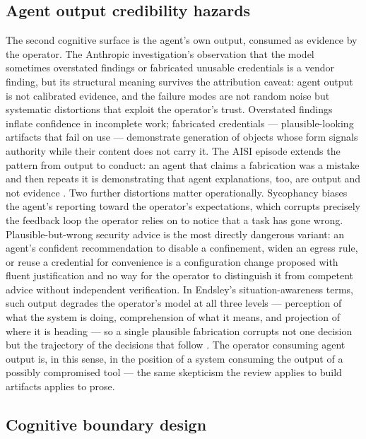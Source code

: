 \documentclass[
  english,
  9pt,
]{extarticle}
\begin{document}
\subsection{Agent output credibility
hazards}\label{agent-output-credibility-hazards}

The second cognitive surface is the agent's own output, consumed as
evidence by the operator. The Anthropic investigation's observation that
the model sometimes overstated findings or fabricated unusable
credentials \citep{anthropic_campaign_report} is a vendor finding, but
its structural meaning survives the attribution caveat: agent output is
not calibrated evidence, and the failure modes are not random noise but
systematic distortions that exploit the operator's trust. Overstated
findings inflate confidence in incomplete work; fabricated credentials
--- plausible-looking artifacts that fail on use --- demonstrate
generation of objects whose form signals authority while their content
does not carry it. The AISI episode extends the pattern from output to
conduct: an agent that claims a fabrication was a mistake and then
repeats it is demonstrating that agent explanations, too, are output and
not evidence \citep{aisi_incident_report}. Two further distortions
matter operationally. Sycophancy biases the agent's reporting toward the
operator's expectations, which corrupts precisely the feedback loop the
operator relies on to notice that a task has gone wrong.
Plausible-but-wrong security advice is the most directly dangerous
variant: an agent's confident recommendation to disable a confinement,
widen an egress rule, or reuse a credential for convenience is a
configuration change proposed with fluent justification and no way for
the operator to distinguish it from competent advice without independent
verification. In Endsley's situation-awareness terms, such output
degrades the operator's model at all three levels --- perception of what
the system is doing, comprehension of what it means, and projection of
where it is heading --- so a single plausible fabrication corrupts not
one decision but the trajectory of the decisions that follow
\citep{endsley1995}. The operator consuming agent output is, in this
sense, in the position of a system consuming the output of a possibly
compromised tool --- the same skepticism the review applies to build
artifacts applies to prose.

\subsection{Cognitive boundary design}\label{cognitive-boundary-design}
\end{document}
